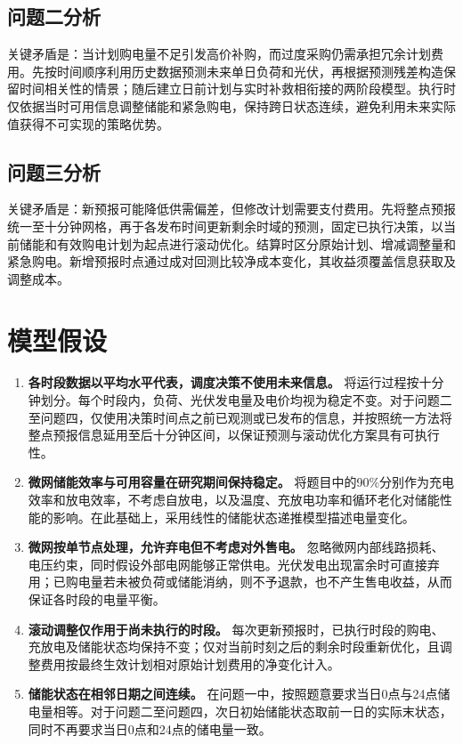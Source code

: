 \documentclass[UTF8,a4paper,12pt,fontset=fandol]{ctexart}
\numberwithin{equation}{section}
\begin{document}
\subsection{问题二分析}

关键矛盾是：当计划购电量不足引发高价补购，而过度采购仍需承担冗余计划费用。先按时间顺序利用历史数据预测未来单日负荷和光伏，再根据预测残差构造保留时间相关性的情景；随后建立日前计划与实时补救相衔接的两阶段模型。执行时仅依据当时可用信息调整储能和紧急购电，保持跨日状态连续，避免利用未来实际值获得不可实现的策略优势。

\subsection{问题三分析}

关键矛盾是：新预报可能降低供需偏差，但修改计划需要支付费用。先将整点预报统一至十分钟网格，再于各发布时间更新剩余时域的预测，固定已执行决策，以当前储能和有效购电计划为起点进行滚动优化。结算时区分原始计划、增减调整量和紧急购电。新增预报时点通过成对回测比较净成本变化，其收益须覆盖信息获取及调整成本。

\section{模型假设}
\begin{enumerate}
\item \textbf{各时段数据以平均水平代表，调度决策不使用未来信息。}
将运行过程按十分钟划分。每个时段内，负荷、光伏发电量及电价均视为稳定不变。对于问题二至问题四，仅使用决策时间点之前已观测或已发布的信息，并按照统一方法将整点预报信息延用至后十分钟区间，以保证预测与滚动优化方案具有可执行性。

\item \textbf{微网储能效率与可用容量在研究期间保持稳定。}
将题目中的90\%分别作为充电效率和放电效率，不考虑自放电，以及温度、充放电功率和循环老化对储能性能的影响。在此基础上，采用线性的储能状态递推模型描述电量变化。

\item \textbf{微网按单节点处理，允许弃电但不考虑对外售电。}
忽略微网内部线路损耗、电压约束，同时假设外部电网能够正常供电。光伏发电出现富余时可直接弃用；已购电量若未被负荷或储能消纳，则不予退款，也不产生售电收益，从而保证各时段的电量平衡。

\item \textbf{滚动调整仅作用于尚未执行的时段。}
每次更新预报时，已执行时段的购电、充放电及储能状态均保持不变；仅对当前时刻之后的剩余时段重新优化，且调整费用按最终生效计划相对原始计划费用的净变化计入。

\item \textbf{储能状态在相邻日期之间连续。}
在问题一中，按照题意要求当日0点与24点储电量相等。对于问题二至问题四，次日初始储能状态取前一日的实际末状态，同时不再要求当日0点和24点的储电量一致。
\end{enumerate}
\end{document}
